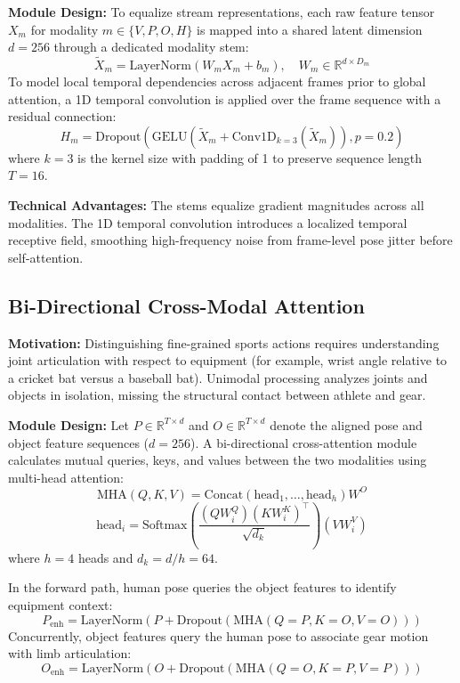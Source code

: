 \documentclass[conference]{IEEEtran}
\begin{document}
\textbf{Module Design:} To equalize stream representations, each raw feature tensor $X_m$ for modality $m \in \{V, P, O, H\}$ is mapped into a shared latent dimension $d = 256$ through a dedicated modality stem:
\begin{equation}
\tilde{X}_m = \text{LayerNorm}(W_m X_m + b_m), \quad W_m \in \mathbb{R}^{d \times D_m}
\end{equation}
To model local temporal dependencies across adjacent frames prior to global attention, a 1D temporal convolution is applied over the frame sequence with a residual connection:
\begin{equation}
H_m = \text{Dropout}\left(\text{GELU}\left(\tilde{X}_m + \text{Conv1D}_{k=3}(\tilde{X}_m)\right), p=0.2\right)
\end{equation}
where $k=3$ is the kernel size with padding of 1 to preserve sequence length $T=16$.

\textbf{Technical Advantages:} The stems equalize gradient magnitudes across all modalities. The 1D temporal convolution introduces a localized temporal receptive field, smoothing high-frequency noise from frame-level pose jitter before self-attention.

\subsection{Bi-Directional Cross-Modal Attention}
\textbf{Motivation:} Distinguishing fine-grained sports actions requires understanding joint articulation with respect to equipment (for example, wrist angle relative to a cricket bat versus a baseball bat). Unimodal processing analyzes joints and objects in isolation, missing the structural contact between athlete and gear.

\textbf{Module Design:} Let $P \in \mathbb{R}^{T \times d}$ and $O \in \mathbb{R}^{T \times d}$ denote the aligned pose and object feature sequences ($d = 256$). A bi-directional cross-attention module calculates mutual queries, keys, and values between the two modalities using multi-head attention:
\begin{equation}
\text{MHA}(Q, K, V) = \text{Concat}(\text{head}_1, \dots, \text{head}_h) W^O
\end{equation}
\begin{equation}
\text{head}_i = \text{Softmax}\left(\frac{(Q W_i^Q)(K W_i^K)^\top}{\sqrt{d_k}}\right) (V W_i^V)
\end{equation}
where $h = 4$ heads and $d_k = d/h = 64$.

In the forward path, human pose queries the object features to identify equipment context:
\begin{equation}
P_{\text{enh}} = \text{LayerNorm}\left(P + \text{Dropout}(\text{MHA}(Q=P, K=O, V=O))\right)
\end{equation}
Concurrently, object features query the human pose to associate gear motion with limb articulation:
\begin{equation}
O_{\text{enh}} = \text{LayerNorm}\left(O + \text{Dropout}(\text{MHA}(Q=O, K=P, V=P))\right)
\end{equation}
\end{document}
